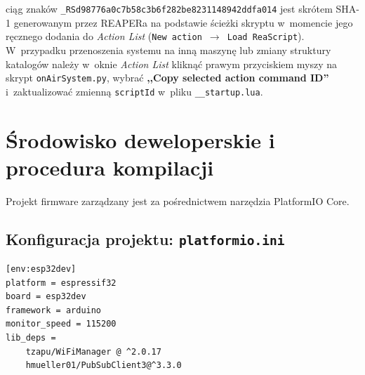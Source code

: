 \documentclass[11pt,a4paper]{article}
\providecommand{\uv}[1]{,,#1''}
\begin{document}
\begin{tcolorbox}[colback=boxBg,colframe=boxFrame,arc=2mm,title=\textbf{Uwaga wdrożeniowa: Identyfikator akcji \texttt{\_RS...} w REAPERze}]
 ciąg znaków \texttt{\_RSd98776a0c7b58c3b6f282be8231148942ddfa014} jest skrótem SHA-1 generowanym przez REAPERa na podstawie ścieżki skryptu w~momencie jego ręcznego dodania do \textit{Action List} (\texttt{New action $\rightarrow$ Load ReaScript}). 
W~przypadku przenoszenia systemu na inną maszynę lub zmiany struktury katalogów należy w~oknie \textit{Action List} kliknąć prawym przyciskiem myszy na skrypt \texttt{onAirSystem.py}, wybrać \textbf{\uv{Copy selected action command ID}} i~zaktualizować zmienną \texttt{scriptId} w~pliku \texttt{\_\_startup.lua}.
\end{tcolorbox}

\newpage

\section{Środowisko deweloperskie i procedura kompilacji}

Projekt firmware zarządzany jest za pośrednictwem narzędzia PlatformIO Core.

\subsection{Konfiguracja projektu: \texttt{platformio.ini}}
\begin{lstlisting}
[env:esp32dev]
platform = espressif32
board = esp32dev
framework = arduino
monitor_speed = 115200
lib_deps =
    tzapu/WiFiManager @ ^2.0.17
    hmueller01/PubSubClient3@^3.3.0
\end{lstlisting}
\end{document}
